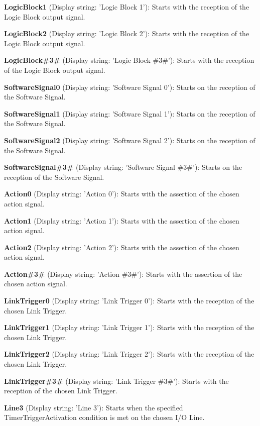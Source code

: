\begin{DoxyItemize}
\item {\bfseries Logic\+Block1} (Display string\+: 'Logic Block 1')\+: Starts with the reception of the Logic Block output signal.
\item {\bfseries Logic\+Block2} (Display string\+: 'Logic Block 2')\+: Starts with the reception of the Logic Block output signal.
\item {\bfseries Logic\+Block\#3\#} (Display string\+: 'Logic Block \#3\#')\+: Starts with the reception of the Logic Block output signal.
\item {\bfseries Software\+Signal0} (Display string\+: 'Software Signal 0')\+: Starts on the reception of the Software Signal.
\item {\bfseries Software\+Signal1} (Display string\+: 'Software Signal 1')\+: Starts on the reception of the Software Signal.
\item {\bfseries Software\+Signal2} (Display string\+: 'Software Signal 2')\+: Starts on the reception of the Software Signal.
\item {\bfseries Software\+Signal\#3\#} (Display string\+: 'Software Signal \#3\#')\+: Starts on the reception of the Software Signal.
\item {\bfseries Action0} (Display string\+: 'Action 0')\+: Starts with the assertion of the chosen action signal.
\item {\bfseries Action1} (Display string\+: 'Action 1')\+: Starts with the assertion of the chosen action signal.
\item {\bfseries Action2} (Display string\+: 'Action 2')\+: Starts with the assertion of the chosen action signal.
\item {\bfseries Action\#3\#} (Display string\+: 'Action \#3\#')\+: Starts with the assertion of the chosen action signal.
\item {\bfseries Link\+Trigger0} (Display string\+: 'Link Trigger 0')\+: Starts with the reception of the chosen Link Trigger.
\item {\bfseries Link\+Trigger1} (Display string\+: 'Link Trigger 1')\+: Starts with the reception of the chosen Link Trigger.
\item {\bfseries Link\+Trigger2} (Display string\+: 'Link Trigger 2')\+: Starts with the reception of the chosen Link Trigger.
\item {\bfseries Link\+Trigger\#3\#} (Display string\+: 'Link Trigger \#3\#')\+: Starts with the reception of the chosen Link Trigger.
\item {\bfseries Line3} (Display string\+: 'Line 3')\+: Starts when the specified Timer\+Trigger\+Activation condition is met on the chosen I/\+O Line.

\end{DoxyItemize}
